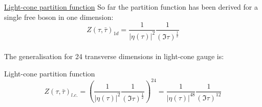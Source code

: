 \documentclass[11pt,aspectratio=169]{beamer}
\begin{document}


\begin{frame}{\underline{Light-cone partition function}}
	So far the partition function has been derived for a single free boson in one dimension:
	\begin{equation}
		Z(\tau, \bar{\tau})_{1d} = \frac{1}{|\eta(\tau)|^2}\frac{1}{(\Im\tau)^{\frac{1}{2}}}
	\end{equation} 
	\\
	The generalisation for 24 transverse dimensions in light-cone gauge is:
	\begin{block}{Light-cone partition function}
		\begin{equation}
			Z(\tau, \bar{\tau})_{l.c.} = (\frac{1}{|\eta(\tau)|^2}\frac{1}{(\Im\tau)^{\frac{1}{2}}})^{24} = \frac{1}{|\eta(\tau)|^{48}}\frac{1}{(\Im\tau)^{12}}
		\end{equation}
	\end{block}
	
\end{frame}

\end{document}
